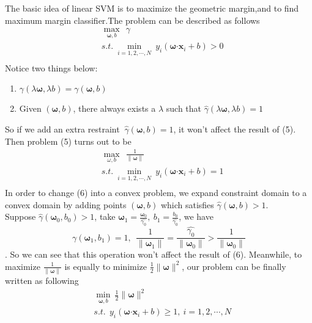 The basic idea of linear SVM is to maximize the geometric margin,and to find maximum margin classifier.The problem can be described as follows
\begin{equation}
 \begin{split}
  &\max_{\bm\omega,b}\ \ \gamma\\
  &s.t.\ \min\limits_{i=1,2,\cdots,N}\ y_{i}(\bm\omega\bm\cdot\bm x_{i}+b)>0\\
 \end{split}
\end{equation}
Notice two things below:
\begin{enumerate}
 \item $\gamma(\lambda\bm\omega,\lambda b)=\gamma(\bm\omega,b)$
 \item Given $(\bm\omega,b)$, there always exists a $\lambda$ such that $\widehat{\gamma}(\lambda\bm\omega,\lambda b)=1$
\end{enumerate}
So if we add an extra restraint $\ \widehat{\gamma}(\bm\omega,b)=1$, it won't affect the result of (5). Then problem (5) turns out to be
\begin{equation}
 \begin{split}
  &\max_{\omega,b}\ \ \frac{1}{\|\bm\omega\|}\\
  &s.t.\ \min\limits_{i=1,2,\cdots,N}\ y_{i}(\bm\omega\bm\cdot\bm x_{i}+b)=1\\
 \end{split}
\end{equation}
In order to change (6) into a convex problem, we expand constraint domain to a convex domain by adding points $(\bm\omega,b)$ which satisfies $\widehat{\gamma}(\bm\omega,b)>1$.
\\Suppose $\widehat{\gamma}(\bm\omega_{0},b_{0})>1$, take $\displaystyle\bm\omega_{1}=\frac{\bm\omega_{0}}{\widehat{\gamma_{0}}},\ b_{1}=\frac{b_{0}}{\widehat{\gamma_{0}}}$, we have $$\displaystyle\gamma(\bm\omega_{1},b_{1})=1,\ \ \frac{1}{\|\bm\omega_{1}\|}=\frac{\widehat{\gamma_{0}}}{\|\bm\omega_{0}\|}>\frac{1}{\|\bm\omega_{0}\|}$$.
So we can see that this operation won't affect the result of (6). Meanwhile, to maximize $\displaystyle\frac{1}{\|\bm\omega\|}$ is equally to minimize $\displaystyle\frac{1}{2}\|\bm\omega\|^2$, our problem can be finally written as following
\begin{equation}
 \begin{split}
  &\min_{\bm\omega,b}\ \frac{1}{2}\|\bm\omega\|^{2}\\
  &s.t.\ \ y_{i}(\bm\omega\bm\cdot\bm x_{i}+b)\geq 1,\ i=1,2,\cdots ,N
 \end{split}
\end{equation}

